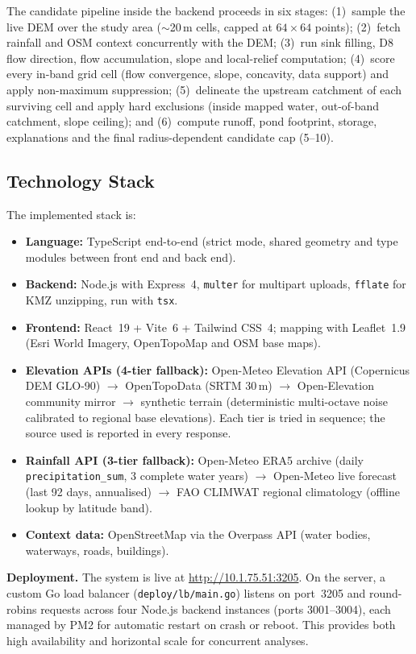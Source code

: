 \documentclass[manuscript,screen,review]{acmart}
\begin{document}
The candidate pipeline inside the backend proceeds in six stages:
(1)~sample the live DEM over the study area ($\sim$20\,m cells, capped at
$64\times64$ points); (2)~fetch rainfall and OSM context concurrently with
the DEM; (3)~run sink filling, D8 flow direction, flow accumulation, slope
and local-relief computation; (4)~score every in-band grid cell
(flow convergence, slope, concavity, data support) and apply non-maximum
suppression; (5)~delineate the upstream catchment of each surviving cell and
apply hard exclusions (inside mapped water, out-of-band catchment, slope
ceiling); and (6)~compute runoff, pond footprint, storage, explanations and
the final radius-dependent candidate cap (5--10).

\subsection{Technology Stack}
The implemented stack is:

\begin{itemize}
  \item \textbf{Language:} TypeScript end-to-end (strict mode, shared
  geometry and type modules between front end and back end).
  \item \textbf{Backend:} Node.js with Express~4, \texttt{multer} for
  multipart uploads, \texttt{fflate} for KMZ unzipping, run with
  \texttt{tsx}.
  \item \textbf{Frontend:} React~19 + Vite~6 + Tailwind CSS~4; mapping with
  Leaflet~1.9 (Esri World Imagery, OpenTopoMap and OSM base maps).
  \item \textbf{Elevation APIs (4-tier fallback):} Open-Meteo Elevation API
  (Copernicus DEM GLO-90) $\to$ OpenTopoData (SRTM 30\,m) $\to$
  Open-Elevation community mirror $\to$ synthetic terrain (deterministic
  multi-octave noise calibrated to regional base elevations). Each tier is
  tried in sequence; the source used is reported in every response.
  \item \textbf{Rainfall API (3-tier fallback):} Open-Meteo ERA5 archive
  (daily \texttt{precipitation\_sum}, 3 complete water years) $\to$
  Open-Meteo live forecast (last 92 days, annualised) $\to$
  FAO CLIMWAT regional climatology (offline lookup by latitude band).
  \item \textbf{Context data:} OpenStreetMap via the Overpass API
  (water bodies, waterways, roads, buildings).
\end{itemize}

\textbf{Deployment.} The system is live at
\url{http://10.1.75.51:3205}. On the server, a custom
Go load balancer (\texttt{deploy/lb/main.go}) listens on port~3205 and
round-robins requests across four Node.js backend instances (ports
3001--3004), each managed by PM2 for automatic restart on crash or reboot.
This provides both high availability and horizontal scale for concurrent
analyses.
\end{document}
